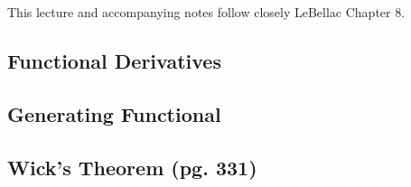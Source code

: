 
This lecture and accompanying notes follow closely LeBellac Chapter 8.


\subsection{Functional Derivatives}


\subsection{Generating Functional}





\subsection{Wick's Theorem (pg. 331)}


